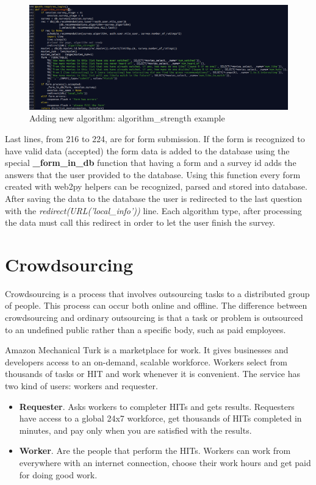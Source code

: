 \begin{figure}
  \centering
  \includegraphics[width=\textwidth]{figures/algorithm_strength.png}
  \caption{Adding new algorithm: algorithm\_strength example}
  \label{fig:algorithm_strength}
\end{figure}

Last lines, from 216 to 224, are for form submission. If the form is recognized to have valid data (accepted) the form data is added to the database using the special \textbf{\_form\_in\_db} function that having a form and a survey id adds the answers that the user provided to the database. Using this function every form created with web2py helpers can be recognized, parsed and stored into database. After saving the data to the database the user is redirected to the last question with the \textit{redirect(URL('local\_info'))} line. Each algorithm type, after processing the data must call this redirect in order to let the user finish the survey.

\section{Crowdsourcing}
\label{sec:crowdsourcing}

Crowdsourcing \cite{crowdsourcing} is a process that involves outsourcing tasks to a distributed group of people. This process can occur both online and offline. The difference between crowdsourcing and ordinary outsourcing is that a task or problem is outsourced to an undefined public rather than a specific body, such as paid employees.

Amazon Mechanical Turk \cite{amazon-mechanical-turk} is a marketplace for work. It gives businesses and developers access to an on-demand, scalable workforce. Workers select from thousands of tasks or \ac{HIT} and work whenever it is convenient. The service has two kind of users: workers and requester.

\begin{itemize}
\item \textbf{Requester}. Asks workers to completer HITs and gets results. Requesters have access to a global 24x7 workforce, get thousands of HITs completed in minutes, and pay only when you are satisfied with the results.
\item \textbf{Worker}. Are the people that perform the HITs. Workers can work from everywhere with an internet connection, choose their work hours and get paid for doing good work.
\end{itemize}

